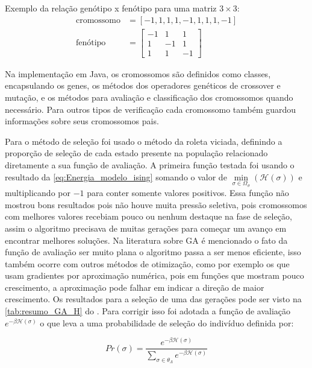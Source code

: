 Exemplo da relação genótipo x fenótipo para uma matriz \( 3 \times 3 \):
\begin{align*}
\text{cromossomo} &= \left[-1, 1, 1, 1, -1, 1, 1, 1, -1 \right]\\
\text{fenótipo} &= \begin{bmatrix}
-1 & 1 & 1 \\
1 & -1 & 1 \\
1 & 1 & -1
\end{bmatrix}
\end{align*}

Na implementação em Java, os cromossomos são definidos como classes, encapsulando os genes, os métodos dos operadores genéticos de crossover e mutação, e os métodos para avaliação e classificação dos cromossomos quando necessário. Para outros tipos de verificação cada cromossomo também guardou informações sobre seus cromossomos pais.

Para o método de seleção foi usado o método da roleta viciada, definindo a proporção de seleção de cada estado presente na população relacionado diretamente a sua função de avaliação. A primeira função testada foi usando o resultado da \autoref{eq:Energia_modelo_ising} somando o valor de \(\min\limits_{\sigma \in \Omega_{\sigma}}(\mathcal{H}(\sigma))\) e multiplicando por \(-1\) para conter somente valores positivos. Essa função não mostrou bons resultados pois não houve muita pressão seletiva, pois cromossomos com melhores valores recebiam pouco ou nenhum destaque na fase de seleção, assim o algoritmo precisava de muitas gerações para começar um avanço em encontrar melhores soluções. Na literatura sobre GA é mencionado o fato da função de avaliação ser muito plana o algoritmo passa a ser menos eficiente, isso também ocorre com outros métodos de otimização, como por exemplo os que usam gradientes por aproximação numérica, pois em funções que mostram pouco crescimento, a aproximação pode falhar em indicar a direção de maior crescimento. Os resultados para a seleção de uma das gerações pode ser visto na \autoref{tab:resumo_GA_H} do . Para corrigir isso foi adotada a função de avaliação \(e^{-\beta \mathcal{H}(\sigma)} \) o que leva a uma probabilidade de seleção do indivíduo definida por:

\begin{equation}
Pr(\sigma) = \frac{e^{-\beta \mathcal{H}(\sigma)}}{\sum\limits_{\sigma \in \theta_{\Lambda}}e^{-\beta \mathcal{H}(\sigma)}}
\label{eq:selecao_modelo_ising}
\end{equation}

